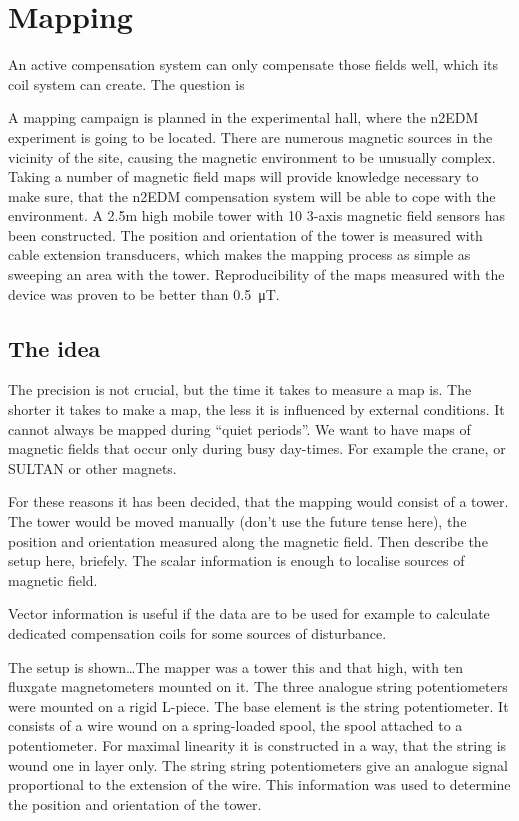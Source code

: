 \chapter{Mapping}
An active compensation system can only compensate those fields well, which its coil system can create. The question is


A mapping campaign is planned in the experimental hall, where the n2EDM experiment is going to be located. There are numerous magnetic sources in the vicinity of the site, causing the magnetic environment to be unusually complex. Taking a number of magnetic field maps will provide knowledge necessary to make sure, that the n2EDM compensation system will be able to cope with the environment. A 2.5m high mobile tower with 10 3-axis magnetic field sensors has been constructed. The position and orientation of the tower is measured with cable extension transducers, which makes the mapping process as simple as sweeping an area with the tower. Reproducibility of the maps measured with the device was proven to be better than \SI{0.5}{\micro\tesla}.



\section{The idea}
The precision is not crucial, but the time it takes to measure a map is. The shorter it takes to make a map, the less it is influenced by external conditions. It cannot always be mapped during ``quiet periods''. We want to have maps of magnetic fields that occur only during busy day-times. For example the crane, or SULTAN or other magnets.

For these reasons it has been decided, that the mapping would consist of a tower. The tower would be moved manually (don't use the future tense here), the position and orientation measured along the magnetic field. Then describe the setup here, briefely. The scalar information is enough to localise sources of magnetic field.

Vector information is useful if the data are to be used for example to calculate dedicated compensation coils for some sources of disturbance.

The setup is shown\ldots The mapper was a tower this and that high, with ten fluxgate magnetometers mounted on it.
The three analogue string potentiometers were mounted on a rigid L-piece. The base element is the string potentiometer. It consists of a wire wound on a spring-loaded spool, the spool attached to a potentiometer. For maximal linearity it is constructed in a way, that the string is wound one in layer only. The string string potentiometers give an analogue signal proportional to the extension of the wire. This information was used to determine the position and orientation of the tower.


